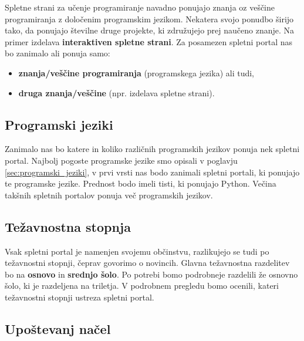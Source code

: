 Spletne strani za učenje programiranje navadno ponujajo znanja oz
veščine programiranja z določenim programskim jezikom. Nekatera svojo
ponudbo širijo tako, da ponujajo številne druge projekte, ki
združujejo prej naučeno znanje. Na primer izdelava
\textbf{interaktiven spletne strani}. Za posamezen spletni portal nas
bo zanimalo ali ponuja samo:

\begin{itemize}
  \tightlist
\item \textbf{znanja/veščine programiranja} (programskega jezika) ali tudi,
\item \textbf{druga znanja/veščine} (npr. izdelava spletne strani).
\end{itemize}


\subsection{Programski jeziki}
\label{sec:_zanaja_programski_jeziki}

Zanimalo nas bo katere in koliko različnih programskih jezikov ponuja
nek spletni portal. Najbolj pogoste programske jezike smo opisali v
poglavju \ref{sec:programski_jeziki}, v prvi vrsti nas bodo zanimali
spletni portali, ki ponujajo te programske jezike. Prednost bodo imeli
tisti, ki ponujajo Python. Večina takšnih spletnih portalov ponuja več
programskih jezikov.

\subsection{Težavnostna stopnja}
\label{sec:težavnostna_stopnja}

Vsak spletni portal je namenjen svojemu občinstvu, razlikujejo se tudi
po težavnostni stopnji, čeprav govorimo o novincih. Glavna težavnostna
razdelitev bo na \textbf{osnovo} in \textbf{srednjo šolo}. Po potrebi
bomo podrobneje razdelili že osnovno šolo, ki je razdeljena na
triletja. V podrobnem pregledu bomo ocenili, kateri težavnostni
stopnji ustreza spletni portal.



\subsection{Upoštevanj načel}
\label{sec:upoštevanje_načel}

